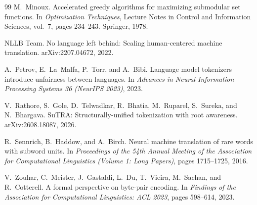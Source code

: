 \documentclass[11pt,a4paper]{article}
\theoremstyle{remark}
\begin{document}
\begin{thebibliography}{99}
M.~Minoux.
\newblock Accelerated greedy algorithms for maximizing submodular set functions.
\newblock In \emph{Optimization Techniques}, Lecture Notes in Control and Information Sciences, vol.~7, pages 234--243. Springer, 1978.

NLLB Team.
\newblock No language left behind: Scaling human-centered machine translation.
\newblock arXiv:2207.04672, 2022.

A.~Petrov, E.~La~Malfa, P.~Torr, and A.~Bibi.
\newblock Language model tokenizers introduce unfairness between languages.
\newblock In \emph{Advances in Neural Information Processing Systems 36 (NeurIPS 2023)}, 2023.

V.~Rathore, S.~Gole, D.~Telwadkar, R.~Bhatia, M.~Ruparel, S.~Sureka, and N.~Bhargava.
\newblock SuTRA: Structurally-unified tokenization with root awareness.
\newblock arXiv:2608.18087, 2026.

R.~Sennrich, B.~Haddow, and A.~Birch.
\newblock Neural machine translation of rare words with subword units.
\newblock In \emph{Proceedings of the 54th Annual Meeting of the Association for Computational Linguistics (Volume 1: Long Papers)}, pages 1715--1725, 2016.

V.~Zouhar, C.~Meister, J.~Gastaldi, L.~Du, T.~Vieira, M.~Sachan, and R.~Cotterell.
\newblock A formal perspective on byte-pair encoding.
\newblock In \emph{Findings of the Association for Computational Linguistics: ACL 2023}, pages 598--614, 2023.

\end{thebibliography}
\end{document}
